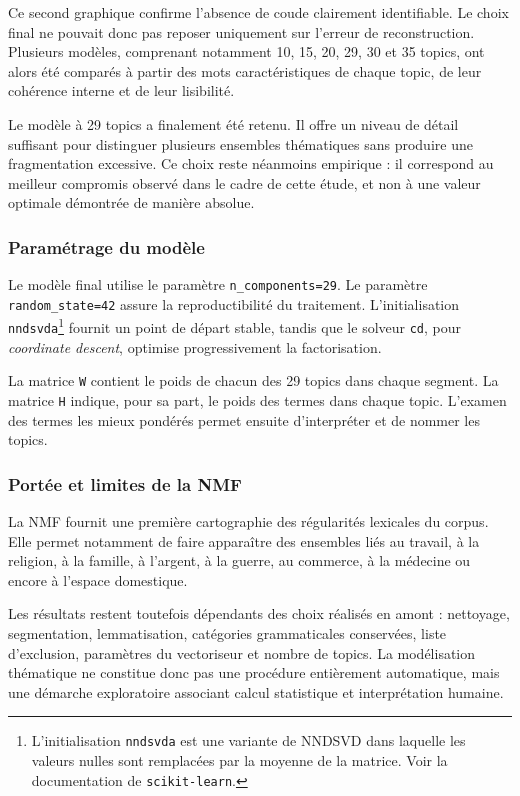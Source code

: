 Ce second graphique confirme l'absence de coude clairement identifiable. Le choix final ne pouvait donc pas reposer uniquement sur l'erreur de reconstruction. Plusieurs modèles, comprenant notamment 10, 15, 20, 29, 30 et 35 topics, ont alors été comparés à partir des mots caractéristiques de chaque topic, de leur cohérence interne et de leur lisibilité.

Le modèle à 29 topics a finalement été retenu. Il offre un niveau de détail suffisant pour distinguer plusieurs ensembles thématiques sans produire une fragmentation excessive. Ce choix reste néanmoins empirique : il correspond au meilleur compromis observé dans le cadre de cette étude, et non à une valeur optimale démontrée de manière absolue.

\subsubsection{Paramétrage du modèle}

Le modèle final utilise le paramètre \texttt{n\_components=29}. Le paramètre \texttt{random\_state=42} assure la reproductibilité du traitement. L'initialisation \texttt{nndsvda}\footnote{L'initialisation \texttt{nndsvda} est une variante de NNDSVD dans laquelle les valeurs nulles sont remplacées par la moyenne de la matrice. Voir la documentation de \texttt{scikit-learn}.} fournit un point de départ stable, tandis que le solveur \texttt{cd}, pour \textit{coordinate descent}, optimise progressivement la factorisation.

La matrice \texttt{W} contient le poids de chacun des 29 topics dans chaque segment. La matrice \texttt{H} indique, pour sa part, le poids des termes dans chaque topic. L'examen des termes les mieux pondérés permet ensuite d'interpréter et de nommer les topics.

\subsubsection{Portée et limites de la NMF}

La NMF fournit une première cartographie des régularités lexicales du corpus. Elle permet notamment de faire apparaître des ensembles liés au travail, à la religion, à la famille, à l'argent, à la guerre, au commerce, à la médecine ou encore à l'espace domestique.

Les résultats restent toutefois dépendants des choix réalisés en amont : nettoyage, segmentation, lemmatisation, catégories grammaticales conservées, liste d'exclusion, paramètres du vectoriseur et nombre de topics. La modélisation thématique ne constitue donc pas une procédure entièrement automatique, mais une démarche exploratoire associant calcul statistique et interprétation humaine.


